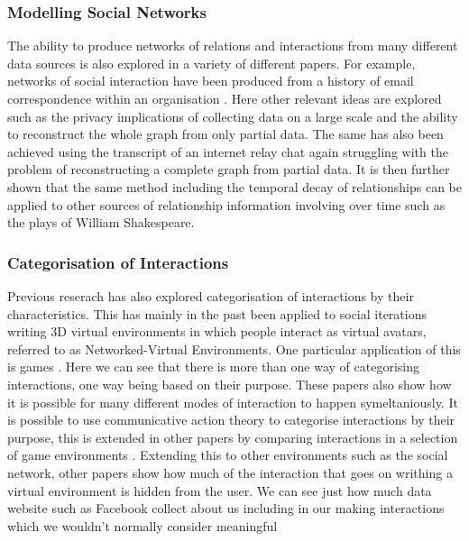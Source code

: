 \documentclass[12pt,a4paper]{article}
\begin{document}
\subsubsection{Modelling Social Networks}
The ability to produce networks of relations and interactions from many different data sources is also explored in a variety of different papers. For example, networks of social interaction have been produced from a history of email correspondence within an organisation \cite{fisher2004social}. Here other relevant ideas are explored such as the privacy implications of collecting data on a large scale and the ability to reconstruct the whole graph from only partial data. The same has also been achieved using the transcript of an internet relay chat \cite{mutton2004inferring} again struggling with the problem of reconstructing a complete graph from partial data. It is then further shown that the same method including the temporal decay of relationships can be applied to other sources of relationship information involving over time such as the plays of William Shakespeare.

\subsubsection{Categorisation of Interactions}
Previous reserach has also explored categorisation of interactions by their characteristics. This has mainly in the past been applied to social iterations writing 3D virtual environments in which people interact as virtual avatars, referred to as Networked-Virtual Environments. One particular application of this is games \cite{manninen2000interaction}. Here we can see that there is more than one way of categorising interactions, one way being based on their purpose. These papers also show how it is possible for many different modes of interaction to happen symeltaniously. It is possible to use communicative action theory to categorise interactions by their purpose, this is extended in other papers by comparing interactions in a selection of game environments \cite{becker2002social}. Extending this to other environments such as the social network, other papers show how much of the interaction that goes on writhing a virtual environment is hidden from the user. We can see just how much data website such as Facebook collect about us including in our making interactions which we wouldn't normally consider meaningful \cite{schneier2010taxonomy}
\end{document}
